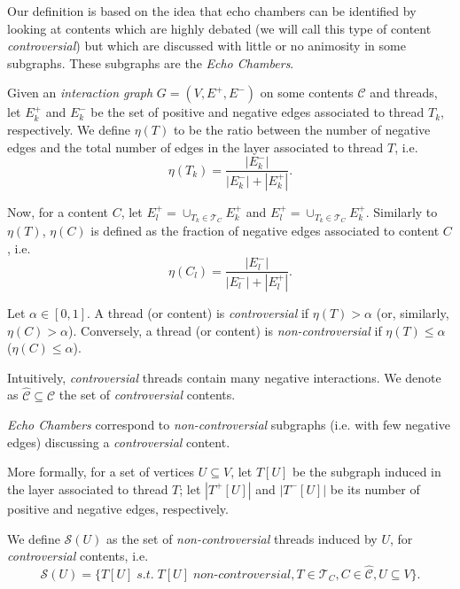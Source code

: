 Our definition is based on the idea that echo chambers can be identified by
looking at contents which are highly debated (we will call
this type of content \emph{controversial}) but which are discussed with little
or no animosity in some subgraphs. These subgraphs are the \emph{Echo
	Chambers}.

\bigskip

Given an \emph{interaction graph} $G = (V, E^{+}, E^{-})$ on some contents
$\mathcal{C} $ and threads, let $E^{+}_k$ and $E^{-}_k$ be the set of
positive and negative edges associated to thread $T_k$, respectively. We define
$\eta(T)$ to be the ratio between the number of
negative edges and the total number of edges in the layer associated to thread
$T$, i.e.
\begin{equation*}
	\eta(T_k) = \frac{|E^{-}_{k}|}{|E^{-}_{k}| + |E^{+}_{k}|}.
\end{equation*}

Now, for a content $C$, let $E^{+}_l = \cup_{T_k \in \mathcal{T} _C} E^+_k$ and $E^{+}_l = \cup_{T_k \in \mathcal{T} _C} E^+_k$.
Similarly to $\eta(T)$, $\eta(C)$ is defined as the fraction of negative edges associated to
content $C$, i.e.
\begin{equation*}
	\eta(C_l) = \frac{|E^{-}_{l}|}{|E^{-}_{l}| + |E^{+}_{l}|}.
\end{equation*}

\begin{definition}
	Let $\alpha \in [0,1]$. A thread (or content) is \emph{controversial} if
	$\eta(T) > \alpha$ (or, similarly, $\eta(C) > \alpha $). Conversely, a
	thread (or content) is \emph{non-controversial} if $\eta(T) \leq \alpha$
	($\eta(C) \leq \alpha$).
\end{definition}

Intuitively, \emph{controversial} threads contain many negative
interactions. We denote as $\hat{\mathcal{C} } \subseteq \mathcal{C} $ the
set of \emph{controversial} contents.

\medskip

\emph{Echo Chambers} correspond to \emph{non-controversial} subgraphs
(i.e. with few negative edges) discussing a
\emph{controversial} content.

More formally, for a set of vertices $U \subseteq V$, let $T[U]$ be the subgraph induced in the layer associated to
thread $T$; let $|T^{+} [U]|$ and $|T^{-} [U]|$ be its number
of positive and negative edges, respectively.

We define $\mathcal{S} (U)$ as the set of \emph{non-controversial} threads
induced by $U$, for \textit{controversial} contents, i.e.
	{\small
		\begin{equation}
			\mathcal{S} (U) = \{ T[U] \; s.t. \; T[U] \; non\text{-}controversial, T \in \mathcal{T} _{C}, C
			\in \hat{\mathcal{C}}, U \subseteq V\}.
		\end{equation}
	}

